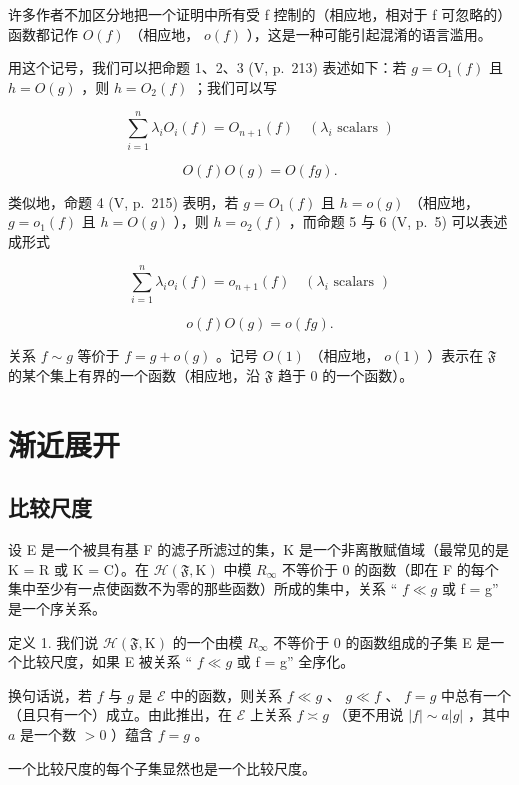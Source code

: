 许多作者不加区分地把一个证明中所有受 f 控制的（相应地，相对于 f 可忽略的）函数都记作 \(O(f)\) （相应地， \(o(f)\) ），这是一种可能引起混淆的语言滥用。

用这个记号，我们可以把命题 1、2、3 (V, p.~213) 表述如下：若 \(g = O_1(f)\) 且 \(h = O(g)\) ，则 \(h = O_2(f)\) ；我们可以写

\[
\sum_ {i = 1} ^ {n} \lambda_ {i} O _ {i} (f) = O _ {n + 1} (f) \quad (\lambda_ {i} \text {   scalars })\tag{1}
\]

\[
O (f) O (g) = O (f g).\tag{2}
\]

类似地，命题 4 (V, p.~215) 表明，若 \(g = O_1(f)\) 且 \(h = o(g)\) （相应地， \(g = o_1(f)\) 且 \(h = O(g)\) ），则 \(h = o_2(f)\) ，而命题 5 与 6 (V, p.~5) 可以表述成形式

\[
\sum_ {i = 1} ^ {n} \lambda_ {i} o _ {i} (f) = o _ {n + 1} (f) \quad (\lambda_ {i} \text {   scalars })\tag{3}
\]

\[
o (f) O (g) = o (f g).\tag{4}
\]

关系 \(f \sim g\) 等价于 \(f = g + o(g)\) 。记号 \(O(1)\) （相应地， \(o(1)\) ）表示在 \(\mathfrak{F}\) 的某个集上有界的一个函数（相应地，沿 \(\mathfrak{F}\) 趋于 0 的一个函数）。

\section{渐近展开}

\subsection{比较尺度}

设 E 是一个被具有基 F 的滤子所滤过的集，K 是一个非离散赋值域（最常见的是 K = R 或 K = C）。在 \(\mathcal{H}(\mathfrak{F}, \mathrm{K})\) 中模 \(R_{\infty}\) 不等价于 0 的函数（即在 F 的每个集中至少有一点使函数不为零的那些函数）所成的集中，关系 “ \(f \ll g\) 或 f = g” 是一个序关系。

定义 1. 我们说 \(\mathcal{H}(\mathfrak{F},\mathrm{K})\) 的一个由模 \(R_{\infty}\) 不等价于 0 的函数组成的子集 E 是一个比较尺度，如果 E 被关系 “ \(f \ll g\) 或 f = g” 全序化。

换句话说，若 \(f\) 与 \(g\) 是 \(\mathcal{E}\) 中的函数，则关系 \(f \ll g\) 、 \(g \ll f\) 、 \(f = g\) 中总有一个（且只有一个）成立。由此推出，在 \(\mathcal{E}\) 上关系 \(f \asymp g\) （更不用说 \(|f| \sim a |g|\) ，其中 \(a\) 是一个数 \(> 0\) ）蕴含 \(f = g\) 。

一个比较尺度的每个子集显然也是一个比较尺度。

